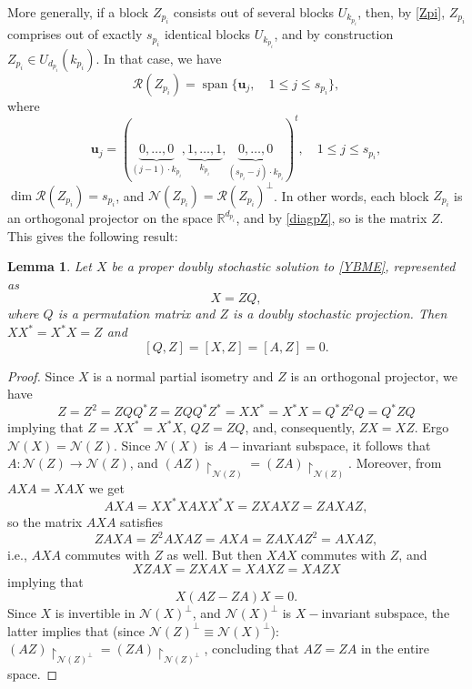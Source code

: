 \documentclass{article}
\newtheorem{lemma}{Lemma}[section]
\theoremstyle{definition}\newtheorem{example}{Example}[section]
\def\N{{\mathcal{N}}}
\def\R{{\mathcal{R}}}
\def\RR{\mathbb{R}}
\begin{document}
More generally, if a block $Z_{p_i}$ consists out of  several blocks $U_{k_{p_i}}$, then, by \eqref{Zpi}, $Z_{p_i}$ comprises out of exactly $s_{p_i}$ identical blocks $U_{k_{p_i}}$, and by construction $Z_{p_i}\in U_{d_{p_i}}(k_{p_i})$. In that case, we have
				$$\R(Z_{p_i})=\operatorname{span}\{\mathbf{u}_j,\quad 1\leq j\leq s_{p_i}\},$$
				where
				$$\mathbf{u}_j=\left(\underbrace{0,\ldots,0}_{(j-1)\cdot k_{p_i}},\underbrace{1,\ldots,1}_{k_{p_i}},\underbrace{0,\ldots,0}_{(s_{p_i}-j)\cdot k_{p_i}}\right)^t,\quad 1\leq j\leq s_{p_i},$$
$\dim \R(Z_{p_i})=s_{p_i}$, and $\N(Z_{p_i})=\R(Z_{p_i})^\perp$. In other words, each block $Z_{p_i}$ is an orthogonal projector on the space $\RR^{d_{p_i}}$, and by \eqref{diagpZ}, so is the matrix $Z$. This gives the following  result:
	\begin{lemma}\label{necescomm}  Let $X$ be a proper doubly stochastic solution to \eqref{YBME}, represented as 
			\begin{equation}\label{XZQ}
				X=ZQ,
			\end{equation}
			where $Q$ is a permutation matrix and $Z$ is a doubly stochastic projection. 
		Then $XX^*=X^*X=Z$ and $$[Q,Z]=[X,Z]=[A,Z]=0.$$
	\end{lemma}
	\begin{proof} Since $X$ is a normal partial isometry and $Z$ is an orthogonal projector, we have
		$$Z=Z^2=ZQQ^*Z=ZQQ^*Z^*=XX^*=X^*X
		=Q^*Z^2Q=Q^*ZQ$$
		implying that $Z=XX^*=X^*X$, $QZ=ZQ$, and, consequently, $ZX=XZ$. Ergo $\N(X)=\N(Z)$. Since $\N(X)$ is $A-$invariant subspace, it follows that $A:\N(Z)\to\N(Z)$, and $(AZ)\upharpoonright_{\N(Z)}=(ZA)\upharpoonright_{\N(Z)}$. Moreover, from $AXA=XAX$ we get
		$$AXA=XX^*XAXX^*X=ZXAXZ=ZAXAZ,$$
		so the matrix $AXA$ satisfies
		$$ZAXA=Z^2AXAZ=AXA=ZAXAZ^2=AXAZ,$$
		i.e., $AXA$ commutes with $Z$ as well. But then $XAX$ commutes with $Z$, and
		$$XZAX=ZXAX=XAXZ=XAZX$$
		implying that
		$$X(AZ-ZA)X=0.$$
		Since $X$ is invertible in $\N(X)^\perp$, and $\N(X)^\perp$ is $X-$invariant subspace, the latter implies that (since $\N(Z)^\perp\equiv\N(X)^\perp$): 
		$(AZ)\upharpoonright_{\N(Z)^\perp}=(ZA)\upharpoonright_{\N(Z)^\perp}$, concluding that $AZ=ZA$ in the entire space.
	\end{proof}
	
\end{document}
